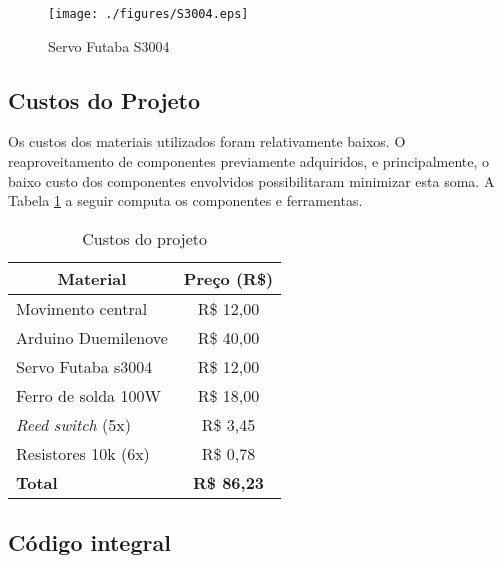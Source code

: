 \documentclass[a4paper,11pt]{article}
\begin{document}
\begin{figure}[!h]
 \begin{center}
  \texttt{[image: ./figures/S3004.eps]}
 \end{center}
 \caption{Servo Futaba S3004}
 \label{fig: servo}
\end{figure}



%
\subsection{Custos do Projeto}
\label{custos}
Os custos dos materiais utilizados foram relativamente baixos. O reaproveitamento de componentes previamente adquiridos, e principalmente, o baixo custo dos componentes envolvidos possibilitaram minimizar esta soma. A Tabela \ref{tab: custos} a seguir computa os componentes e ferramentas.
{
\newcommand{\mc}[3]{\multicolumn{#1}{#2}{#3}}
\begin{table}[!h]
\begin{center}
\caption{Custos do projeto}
\label{tab: custos}
\begin{tabular}{lc}
\mc{1}{c}{\textbf{Material}} & \textbf{Preço (R\$)}\\\hline
Movimento central & R\$ 12,00\\
Arduino Duemilenove & R\$ 40,00\\
Servo Futaba s3004 & R\$ 12,00\\
Ferro de solda 100W & R\$ 18,00\\
\textit{Reed switch} (5x) & R\$ 3,45\\
Resistores 10k (6x) & R\$ 0,78\\\hline
\textbf{Total} & \textbf{R\$ 86,23}\\\hline
\end{tabular}
\end{center}
\end{table}
}



%
\subsection{Código integral}
\label{codigo}
\end{document}
